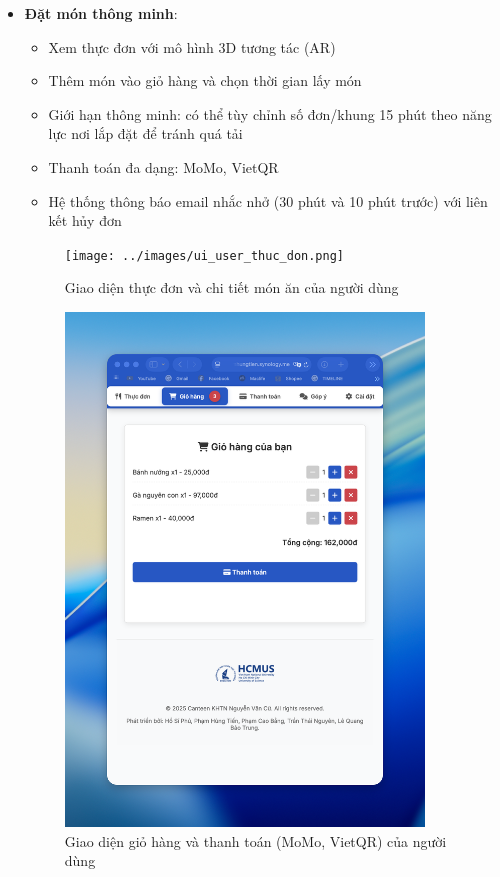 \documentclass[12pt,a4paper]{article}
\begin{document}
\begin{itemize}[leftmargin=1cm]
    \item \textbf{Đặt món thông minh}:
        \begin{itemize}[leftmargin=0.5cm]
            \item Xem thực đơn với mô hình 3D tương tác (AR)
            \item Thêm món vào giỏ hàng và chọn thời gian lấy món
            \item Giới hạn thông minh: có thể tùy chỉnh số đơn/khung 15 phút theo năng lực nơi lắp đặt để tránh quá tải
            \item Thanh toán đa dạng: MoMo, VietQR
            \item Hệ thống thông báo email nhắc nhở (30 phút và 10 phút trước) với liên kết hủy đơn
        \end{itemize}
\begin{figure}[H]
    \centering
    \texttt{[image: ../images/ui\_user\_thuc\_don.png]} %
    \caption{Giao diện thực đơn và chi tiết món ăn của người dùng}
    \label{fig:ui_user_menu}
\end{figure}
\begin{figure}[H]
    \centering
    \includegraphics[width=0.9\textwidth]{../images/ui_user_gio_hang_thanh_toan.png} %
    \caption{Giao diện giỏ hàng và thanh toán (MoMo, VietQR) của người dùng}
    \label{fig:ui_user_cart_payment}
\end{figure}


\end{itemize}
\end{document}
